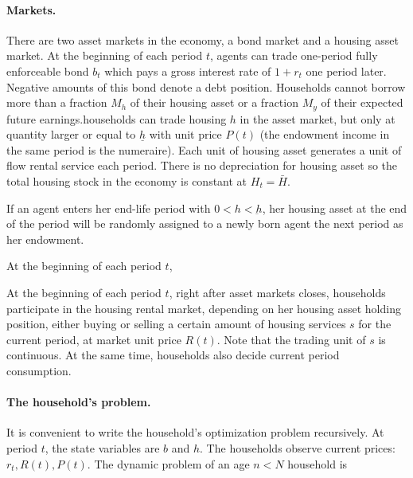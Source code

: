 \documentclass[a4paper,10pt]{article}
\begin{document}
\paragraph{Markets.} There are two asset markets in the economy, a bond market and a housing asset market. At the beginning of each period $t$, agents can trade one-period fully enforceable bond $b_t$ which pays a gross interest rate of $1+r_t$ one period later. Negative amounts of this bond denote a debt position. Households cannot borrow more than a fraction $M_h$ of their housing asset or a fraction $M_y$ of their expected future earnings.households can trade housing $h$ in the asset market, but only at quantity larger or equal to $\underline{h}$ with unit price $P(t)$ (the endowment income in the same period is the numeraire). Each unit of housing asset generates a unit of flow rental service each period. There is no depreciation for housing asset so the total housing stock in the economy is constant at $H_t=\bar{H}$.

If an agent enters her end-life period with $0<h<\underbar{h}$, her housing asset at the end of the period will be randomly assigned to a newly born agent the next period as her endowment.

At the beginning of each period $t$,

At the beginning of each period $t$, right after asset markets closes, households participate in the housing rental market, depending on her housing asset holding position, either buying or selling a certain amount of housing services $s$ for the current period, at market unit price $R(t)$. Note that the trading unit of $s$ is continuous. At the same time, households also decide current period consumption.

\paragraph{The household's problem.}
It is convenient to write the household's optimization problem recursively. At period $t$, the state variables are $b$ and $h$. The households observe current prices: $r_t, R(t), P(t)$. The dynamic problem of an age $n<N$ household is

\end{document}
